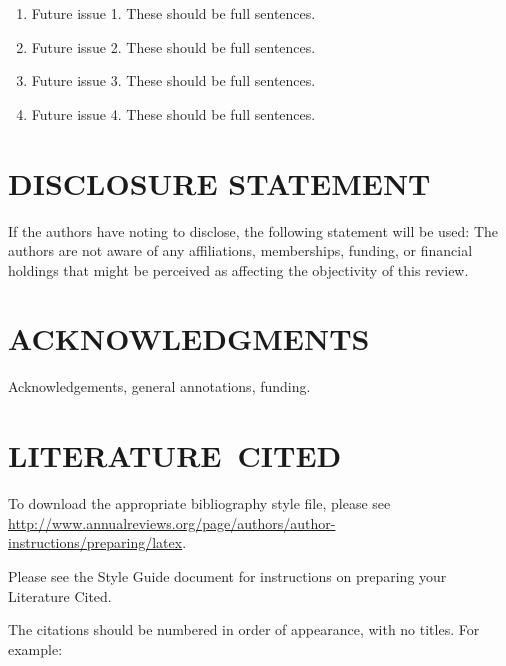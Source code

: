 \documentclass{ar-1col}
\begin{document}
\begin{issues}
\begin{enumerate}
\item Future issue 1. These should be full sentences.
\item Future issue 2. These should be full sentences.
\item Future issue 3. These should be full sentences.
\item Future issue 4. These should be full sentences.
\end{enumerate}
\end{issues}

\section*{DISCLOSURE STATEMENT}
If the authors have noting to disclose, the following statement will be used: The authors are not aware of any affiliations, memberships, funding, or financial holdings that
might be perceived as affecting the objectivity of this review. 

\section*{ACKNOWLEDGMENTS}
Acknowledgements, general annotations, funding.

%
\section*{LITERATURE\ CITED}

To download the appropriate bibliography style file, please see \url{http://www.annualreviews.org/page/authors/author-instructions/preparing/latex}. 

\noindent
Please see the Style Guide document for instructions on preparing your Literature Cited.

The citations should be numbered in order of appearance, with no titles. For example:
\end{document}

